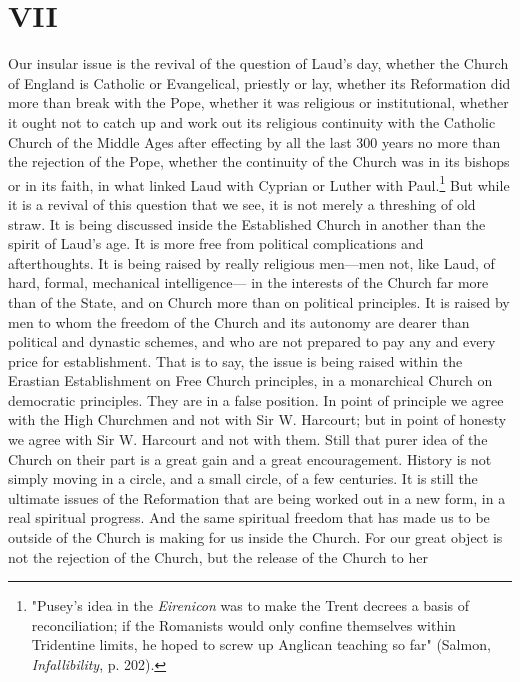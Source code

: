 \documentclass[12pt,a5paper,twoside]{book}
\begin{document}
\section*{VII} 

Our insular issue is the revival of the question of 
Laud's day, whether the Church of England is 
Catholic or Evangelical, priestly or lay, whether its 
Reformation did more than break with the Pope, 
whether it was religious or institutional, whether it 
ought not to catch up and work out its religious 
continuity with the Catholic Church of the Middle 
Ages after effecting by all the last 300 years no 
more than the rejection of the Pope, whether the 
continuity of the Church was in its bishops or in 
its faith, in what linked Laud with Cyprian or Luther 
with Paul.\footnote{
"Pusey's idea in the \textit{Eirenicon} was to make the Trent decrees 
a basis of reconciliation; if the Romanists would only confine 
themselves within Tridentine limits, he hoped to screw up Anglican 
teaching so far" (Salmon, \textit{Infallibility}, p. 202).
} 
But while it is a revival of this question 
that we see, it is not merely a threshing of old straw. 
It is being discussed inside the Established Church in 
another than the spirit of Laud's age. It is more 
free from political complications and afterthoughts. 
It is being raised by really religious men---men not, 
like Laud, of hard, formal, mechanical intelligence---
in the interests of the Church far more than of the 
State, and on Church more than on political principles. 
It is raised by men to whom the freedom of 
the Church and its autonomy are dearer than political 
and dynastic schemes, and who are not prepared to 
pay any and every price for establishment. That is 
to say, the issue is being raised within the Erastian 
Establishment on Free Church principles, in a monarchical 
Church on democratic principles. They are in 
a false position. In point of principle we agree with 
the High Churchmen and not with Sir W. Harcourt; 
but in point of honesty we agree with Sir W. Harcourt 
and not with them. Still that purer idea of the 
Church on their part is a great gain and a great encouragement. 
History is not simply moving in a 
circle, and a small circle, of a few centuries. It is still 
the ultimate issues of the Reformation that are being 
worked out in a new form, in a real spiritual progress. 
And the same spiritual freedom that has made 
us to be outside of the Church is making for us inside 
the Church. For our great object is not the rejection 
of the Church, but the release of the Church to her 
\end{document}
